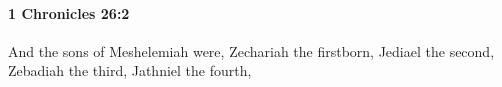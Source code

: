
		\paragraph{1 Chronicles 26:2} %
			\label{1CHRONICLES-26-2}

			And the sons of Meshelemiah were, Zechariah the firstborn, Jediael the second, Zebadiah the third, Jathniel the fourth,


